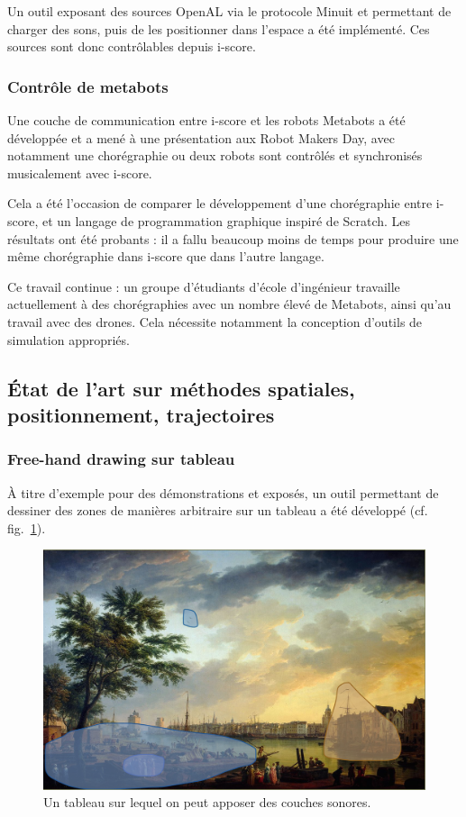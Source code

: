 \documentclass[french,12pt]{article}
\begin{document}
Un outil exposant des sources OpenAL via le protocole Minuit et permettant de charger des sons, puis de les positionner dans l'espace a été implémenté. Ces sources sont donc contrôlables depuis i-score.

\subsubsection{Contrôle de metabots}
Une couche de communication entre i-score et les robots Metabots
a été développée et a mené à une présentation aux Robot Makers Day, avec notamment 
une chorégraphie ou deux robots sont contrôlés et synchronisés musicalement avec i-score. 

Cela a été l'occasion de comparer le développement d'une chorégraphie entre i-score, et 
un langage de programmation graphique inspiré de Scratch. Les résultats ont été probants : il a fallu 
beaucoup moins de temps pour produire une même chorégraphie dans i-score que dans l'autre langage.

Ce travail continue : un groupe d'étudiants d'école d'ingénieur travaille actuellement à des chorégraphies 
avec un nombre élevé de Metabots, ainsi qu'au travail avec des drones. Cela nécessite notamment la conception 
d'outils de simulation appropriés.

\subsection{État de l'art sur méthodes spatiales, positionnement, trajectoires}

\subsubsection{Free-hand drawing sur tableau}
À titre d'exemple pour des démonstrations et exposés, un outil permettant de dessiner des zones de manières arbitraire sur un tableau a été développé (cf. fig.~\ref{fig.tableau}).

\begin{figure}[h]
\centering
\includegraphics[scale=0.2]{images/harbour.png}
\caption{Un tableau sur lequel on peut apposer des couches sonores.}
\label{fig.tableau}
\end{figure} 
\end{document}
